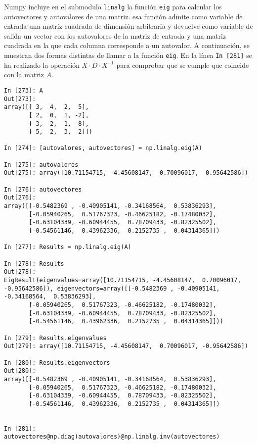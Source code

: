 \begin{paracol}{2}
Numpy incluye en el submodulo \texttt{linalg} la función \texttt{eig} para calcular los autovectores y autovalores de una matriz. esa función admite como variable de entrada una matriz cuadrada de dimensión arbitraria y devuelve como variable de salida un vector con los autovalores de la matriz de entrada y una matriz cuadrada en la que cada columna corresponde a un autovalor. A continuación, se muestran dos formas distintas de llamar a la función \texttt{eig}. En la línea \texttt{In [281]} se ha realizado la operación $X\cdot D \cdot X^{-1}$ para comprobar que se cumple que coincide con la matriz $A$.
\end{paracol}
\begin{center}
    \begin{minipage}{\textwidth}
    \begin{verbatim}
In [273]: A
Out[273]: 
array([[ 3,  4,  2,  5],
       [ 2,  0,  1, -2],
       [ 3,  2,  1,  8],
       [ 5,  2,  3,  2]])

In [274]: [autovalores, autovectores] = np.linalg.eig(A)

In [275]: autovalores
Out[275]: array([10.71154715, -4.45608147,  0.70096017, -0.95642586])

In [276]: autovectores
Out[276]: 
array([[-0.5482369 , -0.40905141, -0.34168564,  0.53836293],
       [-0.05940265,  0.51767323, -0.46625182, -0.17480032],
       [-0.63104339, -0.60944455,  0.78709433, -0.82325502],
       [-0.54561146,  0.43962336,  0.2152735 ,  0.04314365]])

In [277]: Results = np.linalg.eig(A)

In [278]: Results
Out[278]: 
EigResult(eigenvalues=array([10.71154715, -4.45608147,  0.70096017,
-0.95642586]), eigenvectors=array([[-0.5482369 , -0.40905141, -0.34168564,  0.53836293],
       [-0.05940265,  0.51767323, -0.46625182, -0.17480032],
       [-0.63104339, -0.60944455,  0.78709433, -0.82325502],
       [-0.54561146,  0.43962336,  0.2152735 ,  0.04314365]]))

In [279]: Results.eigenvalues
Out[279]: array([10.71154715, -4.45608147,  0.70096017, -0.95642586])

In [280]: Results.eigenvectors
Out[280]: 
array([[-0.5482369 , -0.40905141, -0.34168564,  0.53836293],
       [-0.05940265,  0.51767323, -0.46625182, -0.17480032],
       [-0.63104339, -0.60944455,  0.78709433, -0.82325502],
       [-0.54561146,  0.43962336,  0.2152735 ,  0.04314365]])


In [281]: autovectores@np.diag(autovalores)@np.linalg.inv(autovectores)
\end{verbatim}    
    \end{minipage}
\end{center}
